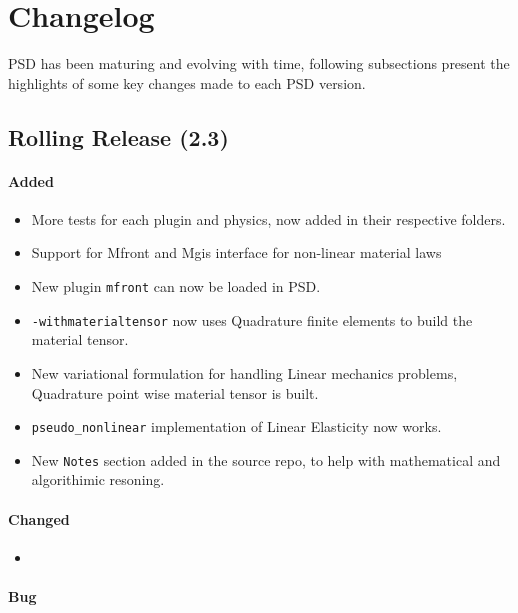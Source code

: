 \section{Changelog}\label{changelog}

PSD has been maturing and evolving with time, following subsections
present the highlights of some key changes made to each PSD version.

\subsection{Rolling Release (2.3)}\label{rolling-release-2.3}

\paragraph{Added}\label{added}

\begin{itemize}
\tightlist
\item
  More tests for each plugin and physics, now added in their respective
  folders.
\item
  Support for Mfront and Mgis interface for non-linear material laws
\item
  New plugin \lstinline!mfront! can now be loaded in PSD.
\item
  \lstinline!-withmaterialtensor! now uses Quadrature finite elements to
  build the material tensor.
\item
  New variational formulation for handling Linear mechanics problems,
  Quadrature point wise material tensor is built.
\item
  \lstinline!pseudo_nonlinear! implementation of Linear Elasticity now
  works.
\item
  New \lstinline!Notes! section added in the source repo, to help with
  mathematical and algorithimic resoning.
\end{itemize}

\paragraph{Changed}\label{changed}

\begin{itemize}
\item
\end{itemize}

\paragraph{Bug}\label{bug}

